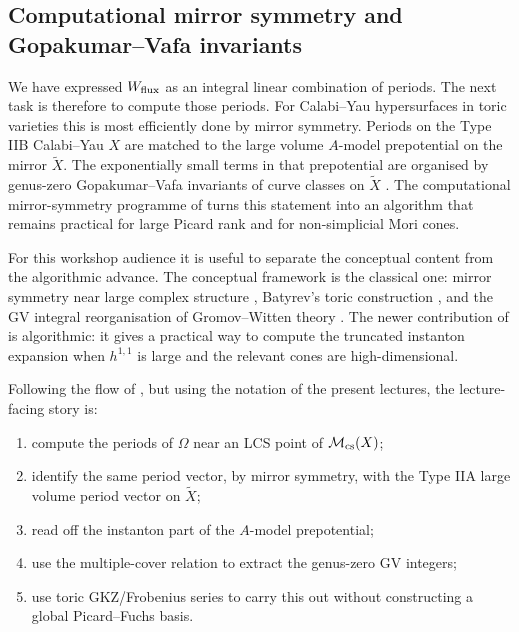 
\subsection{Computational mirror symmetry and Gopakumar--Vafa invariants}\label{ssec:L2-GV}



We have expressed $W_{\rm flux}$ as an integral linear combination of
periods.  The next task is therefore to compute those periods.  For
Calabi--Yau hypersurfaces in toric varieties this is most efficiently
done by mirror symmetry.  Periods on the Type IIB Calabi--Yau $X$ are
matched to the large volume $A$-model prepotential on the mirror
$\widetilde X$.  The exponentially small terms in that prepotential
are organised by genus-zero Gopakumar--Vafa invariants of curve
classes on $\widetilde X$ \cite{Gopakumar:1998ii,Gopakumar:1998jq}.
The computational mirror-symmetry programme of
\cite{Demirtas:2023als,RiosTascon:2023thesis} turns this statement
into an algorithm that remains practical for large Picard rank and for
non-simplicial Mori cones.

For this workshop audience it is useful to separate the conceptual
content from the algorithmic advance.  The conceptual framework is the
classical one: mirror symmetry near large complex structure
\cite{Candelas:1990rm,Hosono:1993qy}, Batyrev's toric construction
\cite{Batyrev:1993oya}, and the GV integral reorganisation of
Gromov--Witten theory \cite{Gopakumar:1998ii,Gopakumar:1998jq}.  The
newer contribution of \cite{Demirtas:2023als} is algorithmic: it gives
a practical way to compute the truncated instanton expansion when
$h^{1,1}$ is large and the relevant cones are high-dimensional.

Following the flow of \cite{Demirtas:2023als}, but using the notation
of the present lectures, the lecture-facing story is:
\begin{enumerate}
    \item compute the periods of $\Omega$ near an LCS point of
    $\mathcal M_{\rm cs}(X)$;
    \item identify the same period vector, by mirror symmetry, with
    the Type IIA large volume period vector on $\widetilde X$;
    \item read off the instanton part of the $A$-model prepotential;
    \item use the multiple-cover relation to extract the genus-zero GV
    integers;
    \item use toric GKZ/Frobenius series to carry this out without
    constructing a global Picard--Fuchs basis.
\end{enumerate}

